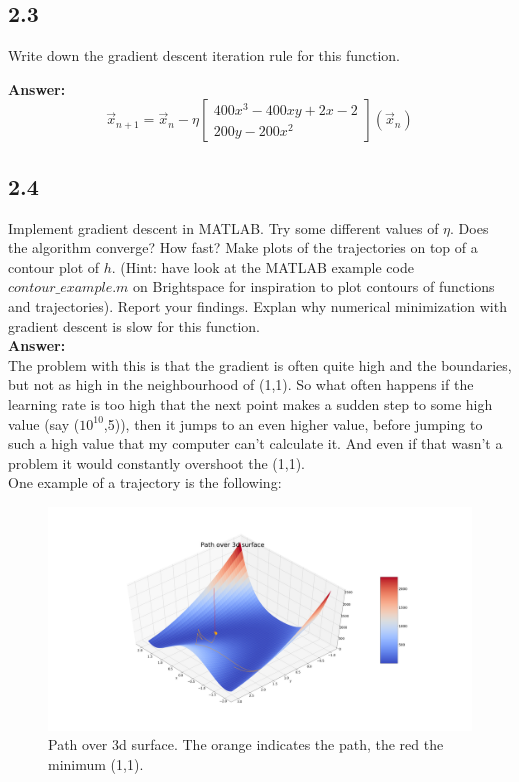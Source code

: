 \documentclass[a4paper]{article}
\begin{document}
\subsection*{2.3}

Write down the gradient descent iteration rule for this function.

\textbf{Answer:}\\


\begin{equation}
\vec x_{n+1} = \vec x_n - \eta \begin{bmatrix}
400x^3-400xy+2x-2\\
200y-200x^2
\end{bmatrix}(\vec x_n)
\end{equation}

\subsection*{2.4}

Implement gradient descent in MATLAB. Try some different values of $\eta$. Does the algorithm converge? How fast? Make plots of the trajectories on top of a contour plot of $h$. (Hint: have look at the MATLAB example code $contour\_example.m$ on Brightspace for inspiration to plot contours of functions and trajectories). Report your findings. Explan why numerical minimization with gradient descent is slow for this function.\\

\textbf{Answer:}\\

The problem with this is that the gradient is often quite high and the boundaries, but not as high in the neighbourhood of (1,1). So what often happens if the learning rate is too high that the next point makes a sudden step to some high value (say ($10^10$,5)), then it jumps to an even higher value, before jumping to such a high value that my computer can't calculate it. And even if that wasn't a problem it would constantly overshoot the (1,1).\\


One example of a trajectory is the following:

\begin{figure}[H]
\center
\hspace*{-2cm}
\includegraphics[width=1.25\textwidth]{Images/Path_over_3d_surface.png}
\caption{Path over 3d surface. The orange indicates the path, the red the minimum (1,1). }
\end{figure}
\end{document}
